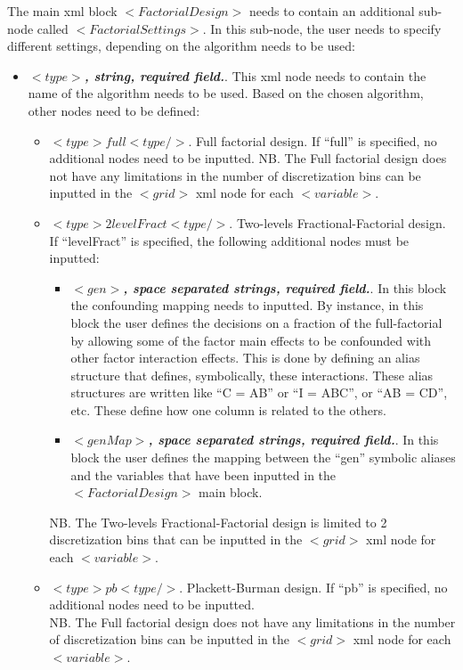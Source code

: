 The main xml block $<FactorialDesign>$ needs to contain an additional sub-node called $<FactorialSettings>$. In this sub-node, the user needs to specify different settings, depending on the algorithm needs to be used:
     \begin{itemize}
      \item $<type>$\textbf{\textit{, string, required field.}}. This xml node needs to contain the name of the algorithm needs to be used. Based on the chosen algorithm, other nodes need to be defined:
      \begin{itemize}
        \item \textit{$<type>full<type/>$}. Full factorial design. If ``full'' is specified, no additional nodes need to be inputted.
         NB. The Full factorial design does not have any limitations in the number of discretization bins can be inputted in the $<grid>$ xml node for each $<variable>$.
         \item \textit{$<type>2levelFract<type/>$}. Two-levels Fractional-Factorial design. If ``levelFract''  is specified, the following additional nodes must be inputted:
         \begin{itemize}
          \item $<gen>$\textbf{\textit{, space separated strings, required field.}}. In this block the confounding mapping needs to inputted.  By instance, in this block the user defines the decisions on a fraction of the full-factorial by allowing some of the factor main effects to be confounded with other factor interaction effects. This is done by defining an alias structure that defines, symbolically, these interactions. These alias structures are written like “C = AB” or “I = ABC”, or “AB = CD”, etc. These define how one column is related to the others.
          \item $<genMap>$\textbf{\textit{, space separated strings, required field.}}. In this block the user defines the mapping between the ``gen'' symbolic aliases and the variables that have been inputted in the $<FactorialDesign>$ main block.
         \end{itemize}
       NB. The Two-levels Fractional-Factorial design is limited to 2 discretization bins that can be inputted in the $<grid>$ xml node for each $<variable>$.
       \item \textit{$<type>pb<type/>$}. Plackett-Burman design. If ``pb'' is specified, no additional nodes need to be inputted.
        \\NB. The Full factorial design does not have any limitations in the number of discretization bins can be inputted in the $<grid>$ xml node for each $<variable>$.
      \end{itemize}  
             
    \end{itemize}  
